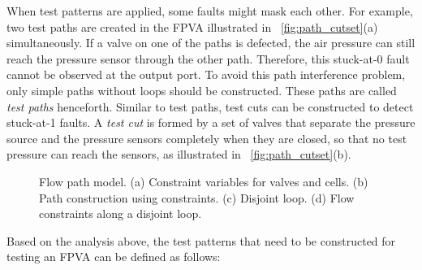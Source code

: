 When test patterns are applied, some faults might mask each other. For
example, two test paths are created in the FPVA illustrated in
\figname~\ref{fig:path_cutset}(a) simultaneously. If a valve on one of the paths is defected, the
air pressure can still reach the pressure sensor through the other path.
Therefore, this stuck-at-0 fault cannot be observed at the output port.
To avoid this path interference problem, only simple paths without loops should
be constructed. These paths are called \textit{test paths} henceforth.
%
Similar to test paths,
test cuts can be constructed to detect stuck-at-1 faults. 
A \textit{test cut}
is formed by a set of valves that separate the pressure source and the pressure
sensors completely when they are closed, so that no test pressure can reach
the sensors, as illustrated in \figname~\ref{fig:path_cutset}(b).

%

\begin{figure*}[t]
{\figurefontsize
\centering

\caption{Flow path model. (a) Constraint variables for valves and cells. (b)
Path construction using constraints. (c) Disjoint loop. (d) Flow constraints
along a disjoint loop.}
\label{fig:flow_path_model}
}
\end{figure*}

Based on the analysis above, the test patterns that need to be constructed for
testing an FPVA can be defined as follows:

